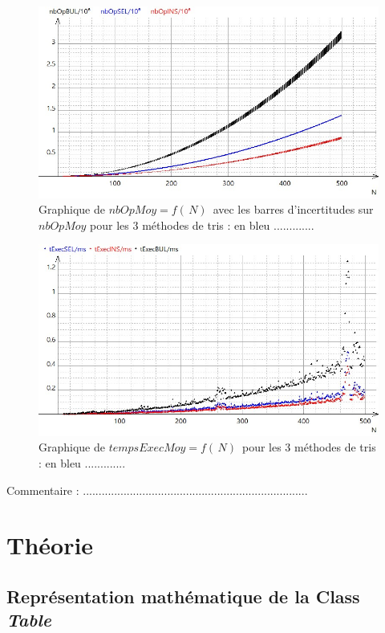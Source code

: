 \documentclass{report}
\begin{document}
\begin{figure}[H]
	\includegraphics[width=\textwidth]{../graphe/nbOp.jpg}
	\caption{Graphique de $nbOpMoy=f(\,N)\,$ avec les barres d'incertitudes sur $nbOpMoy$ pour les 3 méthodes de tris : en bleu .............}
\end{figure}
\begin{figure}[H]
	\includegraphics[width=\textwidth]{../graphe/tExecSansU.jpg}
	\caption{Graphique de $tempsExecMoy=f(\,N)\,$ pour les 3 méthodes de tris : en bleu .............}
\end{figure}

Commentaire : ........................................................................




\chapter{Théorie}

\section{Représentation mathématique de la Class \it Table}
\end{document}
